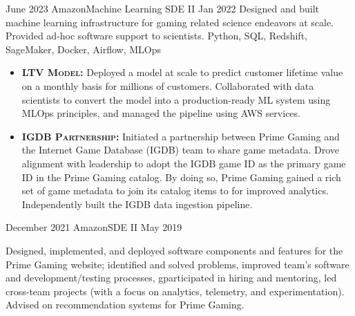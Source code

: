 \documentclass{cv}
\begin{document}
	\begin{experiences_env}
		\experienceWithProjects
		   {June 2023}      {Amazon}{Machine Learning SDE II}
			{Jan 2022}      {
								Designed and built machine learning infrastructure for gaming related science endeavors at scale. Provided ad-hoc software support to scientists.
							}
							{Python, SQL, Redshift, SageMaker, Docker, Airflow, MLOps}
							{
								\begin{itemize}
									\item \textbf{\textsc{LTV Model:}} Deployed a model at scale to predict customer lifetime value on a monthly basis for millions of customers. Collaborated with data scientists to convert the model into a production-ready ML system using MLOps principles, and managed the pipeline using AWS services.
									\item \textbf{\textsc{IGDB Partnership:}} Initiated a partnership between Prime Gaming and the Internet Game Database (IGDB) team to share game metadata. Drove alignment with leadership to adopt the IGDB game ID as the primary game ID in the Prime Gaming catalog. By doing so, Prime Gaming gained a rich set of game metadata to join its catalog items to for improved analytics. Independently built the IGDB data ingestion pipeline.
								\end{itemize}
							}
		\emptySeparator
		\experienceWithProjects
       {December 2021}      {Amazon}{SDE II}
			{May 2019}      {
								Designed, implemented, and deployed software components and features for the Prime Gaming website; identified and solved problems, improved team’s software and development/testing processes, gparticipated in hiring and mentoring, led cross-team projects (with a focus on analytics, telemetry, and experimentation). Advised on recommendation systems for Prime Gaming.
								
}
\end{experiences_env}
\end{document}
